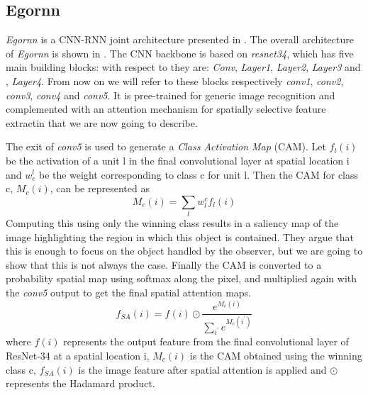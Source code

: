 \documentclass[10pt,twocolumn,hidelinks,letterpaper]{article}
\begin{document}
\subsection{Egornn}
\textit{Egornn} is a CNN-RNN joint architecture presented in \cite{egornn}. The overall architecture of \textit{Egornn} is shown in . The CNN backbone is based on \textit{resnet34}\cite{resnet}, which has five main building blocks: with respect to  they are: \textit{Conv}, \textit{Layer1}, \textit{Layer2}, \textit{Layer3} and , \textit{Layer4}. From now on we will refer to these blocks respectively \textit{conv1}, \textit{conv2}, \textit{conv3}, \textit{conv4} and \textit{conv5}. It is pree-trained for generic image recognition and complemented with an attention mechanism for spatially selective feature extractin that we are now going to describe.

The exit of \textit{conv5} is used to generate a \textit{Class Activation Map} (CAM). Let $f_l(i)$ be the activation of a unit l in the final convolutional layer
at spatial location i and $w_c^l$ be the weight corresponding to class c for unit l. Then the CAM
for class c, $M_c(i)$, can be represented as
\begin{equation*}
M_c(i) = \sum_{l} w_l^c f_l(i)
\end{equation*}
Computing this using only the winning class results in a saliency map of the image highlighting the region in which this object is contained. They argue that this is enough to focus on the object handled by the observer, but we are going to show that this is not always the case. Finally the CAM is converted to a probability spatial map using  softmax along the pixel, and multiplied again with the \textit{conv5} output to get the final spatial attention maps.
\begin{equation*}
f_{SA}(i) = f(i) \odot \frac{e^{M_c(i)} }{ \sum_{i^{'}} e^{M_c(i^{'})}}
\end{equation*}
where $f(i)$ represents the output feature from the final convolutional layer of ResNet-34 at
a spatial location i, $M_c(i)$ is the CAM obtained using the winning class c,
$f_{SA}(i)$ is the image feature after spatial attention is applied and $\odot$ represents the Hadamard product.
\end{document}
